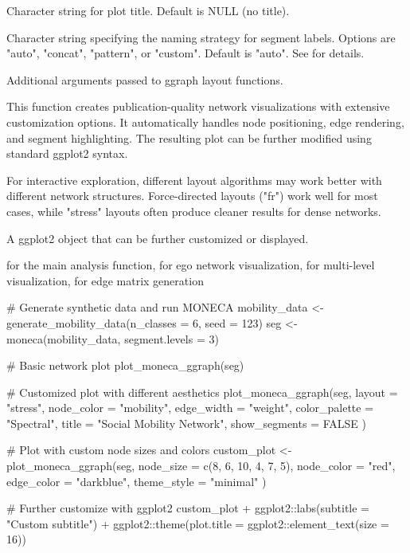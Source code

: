 \documentclass[a4paper]{book}
\begin{document}
\begin{Arguments}
\begin{ldescription}
\item[\code{title}] Character string for plot title. Default is NULL (no title).

\item[\code{segment\_naming}] Character string specifying the naming strategy for 
segment labels. Options are "auto", "concat", "pattern", or "custom". 
Default is "auto". See  for details.

\item[\code{...}] Additional arguments passed to ggraph layout functions.
\end{ldescription}
\end{Arguments}
%
\begin{Details}
This function creates publication-quality network visualizations with extensive
customization options. It automatically handles node positioning, edge rendering,
and segment highlighting. The resulting plot can be further modified using
standard ggplot2 syntax.

For interactive exploration, different layout algorithms may work better with
different network structures. Force-directed layouts ("fr") work well for most
cases, while "stress" layouts often produce cleaner results for dense networks.
\end{Details}
%
\begin{Value}
A ggplot2 object that can be further customized or displayed.
\end{Value}
%
\begin{SeeAlso}
 for the main analysis function,
 for ego network visualization,
 for multi-level visualization,
 for edge matrix generation
\end{SeeAlso}
%
\begin{Examples}
\begin{ExampleCode}
# Generate synthetic data and run MONECA
mobility_data <- generate_mobility_data(n_classes = 6, seed = 123)
seg <- moneca(mobility_data, segment.levels = 3)

# Basic network plot
plot_moneca_ggraph(seg)

# Customized plot with different aesthetics
plot_moneca_ggraph(seg,
  layout = "stress",
  node_color = "mobility",
  edge_width = "weight",
  color_palette = "Spectral",
  title = "Social Mobility Network",
  show_segments = FALSE
)

# Plot with custom node sizes and colors
custom_plot <- plot_moneca_ggraph(seg,
  node_size = c(8, 6, 10, 4, 7, 5),
  node_color = "red",
  edge_color = "darkblue",
  theme_style = "minimal"
)

# Further customize with ggplot2
custom_plot + 
  ggplot2::labs(subtitle = "Custom subtitle") +
  ggplot2::theme(plot.title = ggplot2::element_text(size = 16))

\end{ExampleCode}
\end{Examples}
\end{document}

